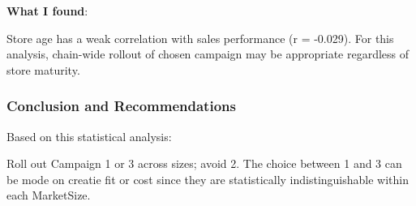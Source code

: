 \documentclass[
]{article}
\begin{document}
\textbf{What I found}:

Store age has a weak correlation with sales performance (r = -0.029).
For this analysis, chain-wide rollout of chosen campaign may be
appropriate regardless of store maturity.

\subsubsection{Conclusion and
Recommendations}\label{conclusion-and-recommendations}

Based on this statistical analysis:

Roll out Campaign 1 or 3 across sizes; avoid 2. The choice between 1 and
3 can be mode on creatie fit or cost since they are statistically
indistinguishable within each MarketSize.
\end{document}
